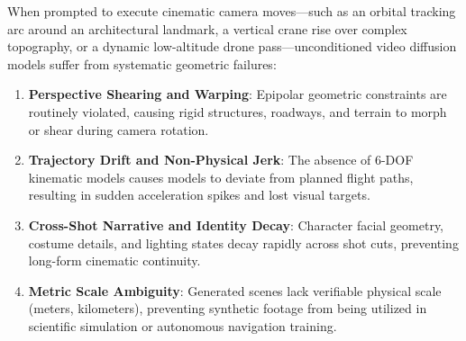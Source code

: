 \documentclass[10pt,twocolumn,letterpaper]{article}
\begin{document}
When prompted to execute cinematic camera moves—such as an orbital tracking arc around an architectural landmark, a vertical crane rise over complex topography, or a dynamic low-altitude drone pass—unconditioned video diffusion models suffer from systematic geometric failures:
\begin{enumerate}
    \item \textbf{Perspective Shearing and Warping}: Epipolar geometric constraints are routinely violated, causing rigid structures, roadways, and terrain to morph or shear during camera rotation.
    \item \textbf{Trajectory Drift and Non-Physical Jerk}: The absence of 6-DOF kinematic models causes models to deviate from planned flight paths, resulting in sudden acceleration spikes and lost visual targets.
    \item \textbf{Cross-Shot Narrative and Identity Decay}: Character facial geometry, costume details, and lighting states decay rapidly across shot cuts, preventing long-form cinematic continuity.
    \item \textbf{Metric Scale Ambiguity}: Generated scenes lack verifiable physical scale (meters, kilometers), preventing synthetic footage from being utilized in scientific simulation or autonomous navigation training.
\end{enumerate}
\end{document}
